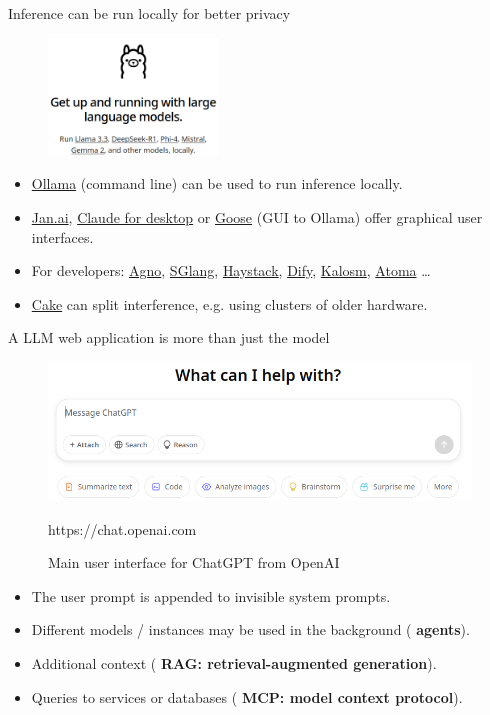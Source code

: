 \documentclass[10pt]{beamer}
\newcommand{\credit}[1]{{\par \raggedleft \scriptsize \mdseries \color{mDarkBrown} #1 \par}}
\newcommand{\feature}[1]{{\color{scLime} \textbf{#1}}}
\begin{document}
\begin{frame}[fragile]{Inference can be run locally for better privacy}
	\begin{figure}
		\includegraphics[width=0.4\textwidth]{figures/Ollama.png}
	\end{figure}
	\begin{itemize}
		\item \href{https://ollama.com}{Ollama} (command line) can be used to run inference locally.
		\item \href{https://jan.ai}{Jan.ai}, \href{https://claude.ai/download}{Claude for desktop} or \href{https://block.github.io/goose}{Goose} (GUI to Ollama) offer graphical user interfaces.
		\item For developers: \href{https://github.com/agno-agi/agno}{Agno}, \href{https://github.com/sgl-project/sglang}{SGlang}, \href{https://haystack.deepset.ai/}{Haystack}, \href{https://github.com/langgenius/dify}{Dify}, \href{https://crates.io/crates/kalosm}{Kalosm}, \href{https://github.com/atoma-network/atoma-infer}{Atoma} \dots
		\item \href{https://github.com/evilsocket/cake}{Cake} can split interference, e.g. using clusters of older hardware.
	\end{itemize}
\end{frame}

\begin{frame}{A LLM web application is more than just the model}
	\begin{figure}
		\includegraphics[width=\textwidth]{figures/OpenAIChatUI.png}
		\caption{Main user interface for ChatGPT from OpenAI}
		\credit{https://chat.openai.com}
	\end{figure}
		\begin{itemize}
			\item The user prompt is appended to invisible system prompts.
			\item Different models / instances may be used in the background (\feature{agents}).
			\item Additional context (\feature{RAG: retrieval-augmented generation}).
			\item Queries to services or databases (\feature{MCP: model context protocol}).
		\end{itemize}
\end{frame}
\end{document}

